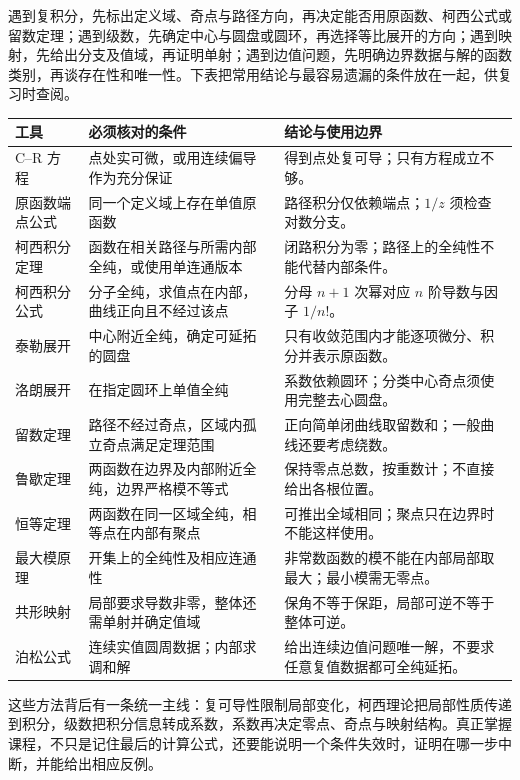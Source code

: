 遇到复积分，先标出定义域、奇点与路径方向，再决定能否用原函数、柯西公式或留数定理；遇到级数，先确定中心与圆盘或圆环，再选择等比展开的方向；遇到映射，先给出分支及值域，再证明单射；遇到边值问题，先明确边界数据与解的函数类别，再谈存在性和唯一性。下表把常用结论与最容易遗漏的条件放在一起，供复习时查阅。

\begin{longtable}{@{}p{}p{}p{}@{}}
\toprule
工具 & 必须核对的条件 & 结论与使用边界 \\
\midrule
\endhead
C--R 方程 & 点处实可微，或用连续偏导作为充分保证 & 得到点处复可导；只有方程成立不够。 \\
原函数端点公式 & 同一个定义域上存在单值原函数 & 路径积分仅依赖端点；$1/z$ 须检查对数分支。 \\
柯西积分定理 & 函数在相关路径与所需内部全纯，或使用单连通版本 & 闭路积分为零；路径上的全纯性不能代替内部条件。 \\
柯西积分公式 & 分子全纯，求值点在内部，曲线正向且不经过该点 & 分母 $n+1$ 次幂对应 $n$ 阶导数与因子 $1/n!$。 \\
泰勒展开 & 中心附近全纯，确定可延拓的圆盘 & 只有收敛范围内才能逐项微分、积分并表示原函数。 \\
洛朗展开 & 在指定圆环上单值全纯 & 系数依赖圆环；分类中心奇点须使用完整去心圆盘。 \\
留数定理 & 路径不经过奇点，区域内孤立奇点满足定理范围 & 正向简单闭曲线取留数和；一般曲线还要考虑绕数。 \\
鲁歇定理 & 两函数在边界及内部附近全纯，边界严格模不等式 & 保持零点总数，按重数计；不直接给出各根位置。 \\
恒等定理 & 两函数在同一区域全纯，相等点在内部有聚点 & 可推出全域相同；聚点只在边界时不能这样使用。 \\
最大模原理 & 开集上的全纯性及相应连通性 & 非常数函数的模不能在内部局部取最大；最小模需无零点。 \\
共形映射 & 局部要求导数非零，整体还需单射并确定值域 & 保角不等于保距，局部可逆不等于整体可逆。 \\
泊松公式 & 连续实值圆周数据；内部求调和解 & 给出连续边值问题唯一解，不要求任意复值数据都可全纯延拓。 \\
\bottomrule
\end{longtable}

这些方法背后有一条统一主线：复可导性限制局部变化，柯西理论把局部性质传递到积分，级数把积分信息转成系数，系数再决定零点、奇点与映射结构。真正掌握课程，不只是记住最后的计算公式，还要能说明一个条件失效时，证明在哪一步中断，并能给出相应反例。


